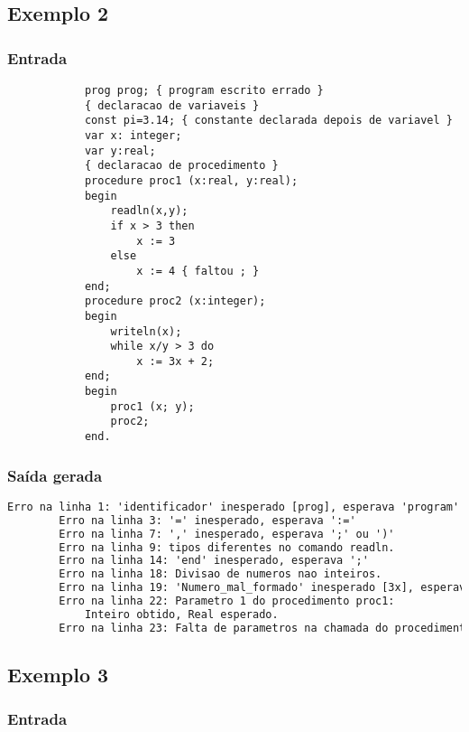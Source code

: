 \documentclass{article}
\begin{document}
	\subsection{Exemplo 2} %
	\label{sub:exemplo_2}

		\subsubsection*{Entrada} %
		\label{ssub:entrada}
		\begin{lstlisting}
			prog prog; { program escrito errado }
			{ declaracao de variaveis }
			const pi=3.14; { constante declarada depois de variavel }
			var x: integer;
			var y:real;
			{ declaracao de procedimento }
			procedure proc1 (x:real, y:real);
			begin
				readln(x,y);
				if x > 3 then
					x := 3
				else
					x := 4 { faltou ; }
			end;
			procedure proc2 (x:integer);
			begin
				writeln(x);
				while x/y > 3 do
					x := 3x + 2;
			end;
			begin
				proc1 (x; y);
				proc2;
			end.
		\end{lstlisting}
		\subsubsection*{Saída gerada} %
		\label{ssub:sa_da_gerada}
		\begin{lstlisting}[language=TeX]
		Erro na linha 1: 'identificador' inesperado [prog], esperava 'program'
		Erro na linha 3: '=' inesperado, esperava ':='
		Erro na linha 7: ',' inesperado, esperava ';' ou ')'
		Erro na linha 9: tipos diferentes no comando readln.
		Erro na linha 14: 'end' inesperado, esperava ';'
		Erro na linha 18: Divisao de numeros nao inteiros.
		Erro na linha 19: 'Numero_mal_formado' inesperado [3x], esperava 'identificador' ou '(' ou 'numero_inteiro' ou 'numero_real'
		Erro na linha 22: Parametro 1 do procedimento proc1:
			Inteiro obtido, Real esperado. 
		Erro na linha 23: Falta de parametros na chamada do procedimento proc2. 1 parametro	
		\end{lstlisting}

	\subsection{Exemplo 3} %
	\label{sub:exemplo_3}
		\subsubsection*{Entrada} %
		\label{ssub:entrada}
		
\end{document}
